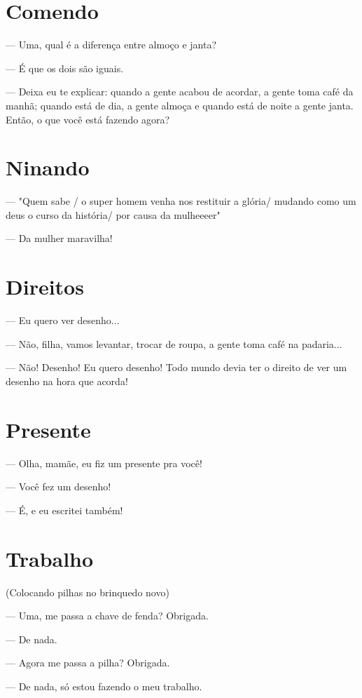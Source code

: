 \chapter{Comendo}

— Uma, qual é a diferença entre almoço e janta?

— É que os dois são iguais.

— Deixa eu te explicar: quando a gente acabou de acordar, a gente toma
café da manhã; quando está de dia, a gente almoça e quando está de noite
a gente janta. Então, o que você está fazendo agora?

\chapter{Ninando}

— "Quem sabe / o super homem venha nos restituir a glória/ mudando como
um deus o curso da história/ por causa da mulheeeer"

— Da mulher maravilha!

\chapter{Direitos}

— Eu quero ver desenho...

— Não, filha, vamos levantar, trocar de roupa, a gente toma café na
padaria...

— Não! Desenho! Eu quero desenho! Todo mundo devia ter o direito de ver
um desenho na hora que acorda!

\chapter{Presente}

— Olha, mamãe, eu fiz um presente pra você!

— Você fez um desenho!

— É, e eu escritei também!

\chapter{Trabalho}

(Colocando pilhas no brinquedo novo)

— Uma, me passa a chave de fenda? Obrigada.

— De nada.

— Agora me passa a pilha? Obrigada.

— De nada, só estou fazendo o meu trabalho.

